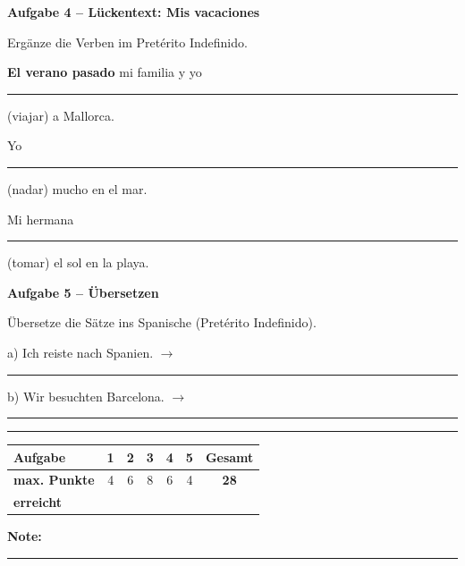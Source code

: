 \documentclass[11pt, a4paper]{article}
\newcommand{\fachfarbe}{spanisch}
\newcommand{\punktebox}[1]{\hfill\fbox{\small \_/#1}}
\newcommand{\luecke}[1]{\rule{#1}{0.4pt}}
\newenvironment{aufgabe}[1]{%
    \needspace{5\baselineskip}%
    \nopagebreak[4]%
    \vspace{10pt}
    \noindent\textbf{\textcolor{\fachfarbe}{Aufgabe #1}}
    \nopagebreak[4]%
    \vspace{5pt}
    \nopagebreak[4]%
    \begin{list}{}{\leftmargin=0pt}
    \item[]
}{%
    \end{list}
}
\begin{document}

\begin{aufgabe}{4 -- Lückentext: Mis vacaciones}
Ergänze die Verben im Pretérito Indefinido. \punktebox{6}
\end{aufgabe}

\noindent
\textbf{El verano pasado} mi familia y yo \luecke{3cm} (viajar) a Mallorca.

\vspace{0.8em}

\noindent
Yo \luecke{3cm} (nadar) mucho en el mar.

\vspace{0.8em}

\noindent
Mi hermana \luecke{3cm} (tomar) el sol en la playa.

\vspace{15pt}


\begin{aufgabe}{5 -- Übersetzen}
Übersetze die Sätze ins Spanische (Pretérito Indefinido). \punktebox{4}
\end{aufgabe}

\noindent
a) Ich reiste nach Spanien. $\rightarrow$ \luecke{6cm}

\vspace{0.8em}

\noindent
b) Wir besuchten Barcelona. $\rightarrow$ \luecke{6cm}


\vspace{25pt}
\hrule
\vspace{10pt}

\noindent
\begin{tabularx}{\textwidth}{|X|c|c|c|c|c||c|}
\hline
\textbf{Aufgabe} & 1 & 2 & 3 & 4 & 5 & \textbf{Gesamt} \\
\hline
\textbf{max. Punkte} & 4 & 6 & 8 & 6 & 4 & \textbf{28} \\
\hline
\textbf{erreicht} & & & & & & \\[0.8em]
\hline
\end{tabularx}

\vspace{10pt}

\begin{flushright}
\textbf{Note:} \luecke{2cm}
\end{flushright}
\end{document}
